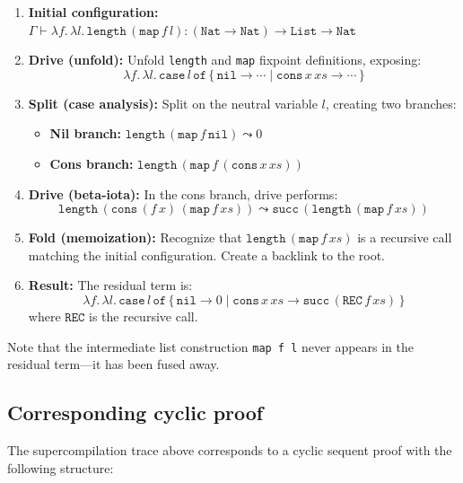 \begin{enumerate}
\item \textbf{Initial configuration:} $\Gamma \vdash \lambda f.\, \lambda l.\, \mathtt{length}\,(\mathtt{map}\,f\,l) : (\mathtt{Nat} \to \mathtt{Nat}) \to \mathtt{List} \to \mathtt{Nat}$

\item \textbf{Drive (unfold):} Unfold \texttt{length} and \texttt{map} fixpoint definitions, exposing:
\[
\lambda f.\, \lambda l.\, \mathtt{case}\,l\,\mathtt{of}\,\{\, \mathtt{nil} \to \cdots \mid \mathtt{cons}\,x\,xs \to \cdots \,\}
\]

\item \textbf{Split (case analysis):} Split on the neutral variable $l$, creating two branches:
\begin{itemize}
  \item \textbf{Nil branch:} $\mathtt{length}\,(\mathtt{map}\,f\,\mathtt{nil}) \leadsto 0$
  \item \textbf{Cons branch:} $\mathtt{length}\,(\mathtt{map}\,f\,(\mathtt{cons}\,x\,xs))$
\end{itemize}

\item \textbf{Drive (beta-iota):} In the cons branch, drive performs:
\[
\mathtt{length}\,(\mathtt{cons}\,(f\,x)\,(\mathtt{map}\,f\,xs)) \leadsto \mathtt{succ}\,(\mathtt{length}\,(\mathtt{map}\,f\,xs))
\]

\item \textbf{Fold (memoization):} Recognize that $\mathtt{length}\,(\mathtt{map}\,f\,xs)$ is a recursive call matching the initial configuration. Create a backlink to the root.

\item \textbf{Result:} The residual term is:
\[
\lambda f.\, \lambda l.\, \mathtt{case}\,l\,\mathtt{of}\,\{\, \mathtt{nil} \to 0 \mid \mathtt{cons}\,x\,xs \to \mathtt{succ}\,(\mathtt{REC}\,f\,xs) \,\}
\]
where $\mathtt{REC}$ is the recursive call.
\end{enumerate}

Note that the intermediate list construction \texttt{map f l} never appears in the residual term---it has been fused away.

\subsection{Corresponding cyclic proof}

The supercompilation trace above corresponds to a cyclic sequent proof with the following structure:

